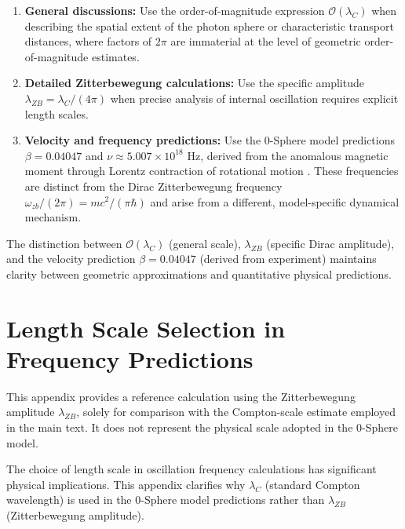 \documentclass[%
 reprint,
 amsmath,amssymb,
 aps,
 prb,
]{revtex4-2}
\numberwithin{equation}{section}
\begin{document}
\begin{enumerate}
\item \textbf{General discussions:} Use the order-of-magnitude expression $\mathcal{O}(\lambda_C)$ when describing the spatial extent of the photon sphere or characteristic transport distances, where factors of $2\pi$ are immaterial at the level of geometric order-of-magnitude estimates.

\item \textbf{Detailed Zitterbewegung calculations:} Use the specific amplitude $\lambda_{ZB} = \lambda_C/(4\pi)$ when precise analysis of internal oscillation requires explicit length scales.

\item \textbf{Velocity and frequency predictions:} Use the 0-Sphere model predictions $\beta = 0.04047$ and $\nu \approx 5.007 \times 10^{18}$ Hz, derived from the anomalous magnetic moment through Lorentz contraction of rotational motion \cite{hanamura17764997}. These frequencies are distinct from the Dirac Zitterbewegung frequency $\omega_{zb}/(2\pi) = mc^2/(\pi\hbar)$ and arise from a different, model-specific dynamical mechanism.
\end{enumerate}

The distinction between $\mathcal{O}(\lambda_C)$ (general scale), $\lambda_{ZB}$ (specific Dirac amplitude), and the velocity prediction $\beta = 0.04047$ (derived from experiment) maintains clarity between geometric approximations and quantitative physical predictions.

\section{Length Scale Selection in Frequency Predictions}
\label{sec:appendix_scale_selection}

This appendix provides a reference calculation using the Zitterbewegung amplitude $\lambda_{ZB}$, solely for comparison with the Compton-scale estimate employed in the main text. It does not represent the physical scale adopted in the 0-Sphere model.

The choice of length scale in oscillation frequency calculations has significant physical implications. This appendix clarifies why $\lambda_C$ (standard Compton wavelength) is used in the 0-Sphere model predictions rather than $\lambda_{ZB}$ (Zitterbewegung amplitude).
\end{document}
